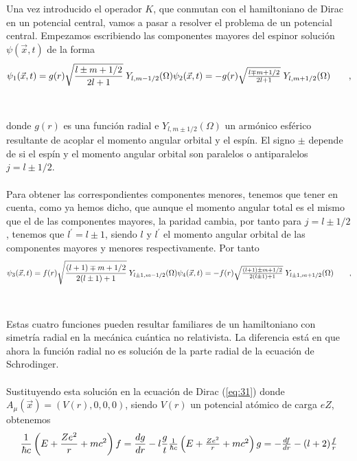 \documentclass[11pt,letterpaper]{article}     %
\begin{document}
Una vez introducido el operador $K$, que conmutan con el hamiltoniano de Dirac en un potencial central, vamos a pasar a resolver el problema de un potencial central. Empezamos escribiendo las componentes mayores del espinor solución $\psi(\vec{x},t)$ de la forma
\begin{equation} \label{eq:89}
\psi_1(\vec{x},t)=g(r)\sqrt{\frac{l\pm m+1/2}{2l+1}} \; Y_{l,m-1/2}(\Omega) $$\\$$
\psi_2(\vec{x},t)=-g(r)\sqrt{\frac{l \mp m+1/2}{2l+1}} \; Y_{l,m+1/2}(\Omega) \qquad ,
\end{equation} \\ \\
donde $g(r)$ es una función radial e $Y_{l,m \pm 1/2}(\Omega)$ un armónico esférico resultante de acoplar el momento angular orbital y el espín. El signo $\pm$ depende de si el espín y el momento angular orbital son paralelos o antiparalelos $j=l\pm 1/2$. \\ \\
Para obtener las correspondientes componentes menores, tenemos que tener en cuenta, como ya hemos dicho, que aunque el momento angular total es el mismo que el de las componentes mayores, la paridad cambia, por tanto para $j=l \pm 1/2$, tenemos que $l^{'}=l\pm 1$, siendo $l$ y $l^{'}$ el momento angular orbital de las componentes mayores y menores respectivamente. Por tanto
\begin{equation} \label{eq:90}
\psi_3(\vec{x},t)=f(r)\sqrt{\frac{(l+1)\mp m+1/2}{2(l\pm 1)+1}} \; Y_{l\pm 1,m-1/2}(\Omega) $$\\$$
\psi_4(\vec{x},t)=-f(r)\sqrt{\frac{(l+1) \pm m+1/2}{2(l \pm 1)+1}} \; Y_{l \pm 1,m+1/2}(\Omega) \qquad ,
\end{equation} \\ \\
Estas cuatro funciones pueden resultar familiares de un hamiltoniano con simetría radial en la mecánica cuántica no relativista. La diferencia está en que ahora la función radial no es solución de la parte radial de la ecuación de Schrodinger. \\ \\
Sustituyendo esta solución en la ecuación de Dirac (\ref{eq:31}) donde $A_\mu(\vec{x})=(V(r),0,0,0)$, siendo $V(r)$ un potencial atómico de carga $eZ$, obtenemos
\begin{equation} \label{eq:91}
\frac{1}{\hbar c}\left(E + \frac{Ze^2}{r} + mc^2 \right) f = \frac{d g}{dr} - l \frac{g}{t} $$\\$$
\frac{1}{\hbar c} \left( E + \frac{Z e^2}{r} + mc^2\right)g = - \frac{df}{dr} - (l+2) \frac{f}{r}
\end{equation} \\ \\
\end{document}
